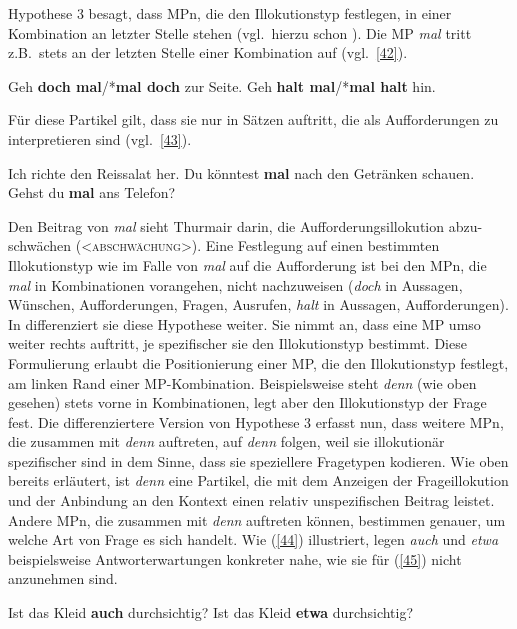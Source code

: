Hypothese 3 besagt, dass MPn, die den Illokutionstyp  festlegen, in einer Kombination an letzter Stelle stehen (vgl.\ hierzu schon \citealt[222, 225]{Dahl1988}). Die MP \textit{mal} tritt z.B.\ stets an der letzten Stelle einer Kombination auf (vgl.\ \ref{42}). 

\begin{exe}
	\ex\label{42} 
		\begin{xlist}	
			\ex\label{42a} Geh \textbf{doch mal}/*\textbf{mal doch} zur Seite.
			\ex\label{42b} Geh \textbf{halt mal}/*\textbf{mal halt} hin.
			\end{xlist}
\end{exe}
Für diese Partikel gilt, dass sie nur in Sätzen auftritt, die als Aufforderungen  zu interpretieren sind (vgl.\ \ref{43}).

\begin{exe}
	\ex\label{43} 
		\begin{xlist}	
			\ex\label{43a} Ich richte den Reissalat her. Du könntest \textbf{mal} nach den Getränken schauen.
			\ex\label{43b} Gehst du \textbf{mal} ans Telefon?
			\hfill\hbox{\citet[184/185]{Thurmair1989}}
		\end{xlist}
\end{exe}
Den Beitrag von \textit{mal} sieht Thurmair darin, die Aufforderungsillokution abzu-schwächen (<\textsc{abschwächung}>). Eine Festlegung auf einen bestimmten Illokutionstyp wie im Falle von \textit{mal} auf die Aufforderung ist bei den MPn, die \textit{mal} in Kombinationen vorangehen, nicht nachzuweisen (\textit{doch} in Aussagen, Wünschen, Aufforderungen, Fragen, Ausrufen, \textit{halt} in Aussagen, Aufforderungen). In \citet[30]{Thurmair1991} differenziert sie diese Hypothese weiter. Sie nimmt an, dass eine MP umso weiter rechts auftritt, je spezifischer sie den Illokutionstyp bestimmt. Diese Formulierung erlaubt die Positionierung einer MP, die den Illokutionstyp festlegt, am linken Rand einer MP-Kombination. Beispielsweise steht \textit{denn} (wie oben gesehen) stets vorne in Kombinationen, legt aber den Illokutionstyp der Frage fest. Die differenziertere Version von Hypothese 3 erfasst nun, dass weitere MPn, die zusammen mit \textit{denn} auftreten, auf \textit{denn} folgen, weil sie illokutionär spezifischer sind in dem Sinne, dass sie speziellere Fragetypen kodieren. Wie oben bereits erläutert, ist \textit{denn} eine Partikel, die mit dem Anzeigen der Frageillokution und der Anbindung an den Kontext einen relativ unspezifi\-schen Beitrag leistet. Andere MPn, die zusammen mit \textit{denn} auftreten können, bestimmen genauer, um welche Art von Frage es sich handelt. Wie (\ref{44}) illustriert, legen \textit{auch} und \textit{etwa} beispielsweise Antworterwartungen  konkreter nahe, wie sie für (\ref{45}) nicht anzunehmen sind.
\begin{exe}
	\ex\label{44} 
		\begin{xlist}	
			\ex\label{44a} Ist das Kleid \textbf{auch} durchsichtig?
			\ex\label{44b} Ist das Kleid \textbf{etwa} durchsichtig?
			\hfill\hbox{\citet[27]{Thurmair1991}}
		\end{xlist}
\end{exe}

